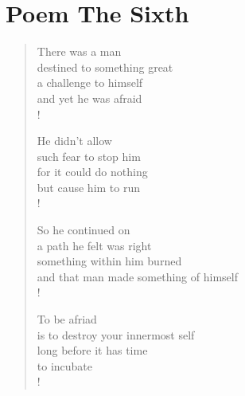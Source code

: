 \section{Poem The Sixth}

\settowidth{\versewidth}{Than Tycho Brahe, or Erra Pater:}
\begin{verse}
There was a man \\
destined to something great \\
a challenge to himself \\
and yet he was afraid \\!

He didn't allow \\
such fear to stop him \\
for it could do nothing \\
but cause him to run \\!

So he continued on \\
a path he felt was right \\
something within him burned \\
and that man made something of himself \\!

To be afriad \\
is to destroy your innermost self \\
long before it has time \\
to incubate \\!
\end{verse}
